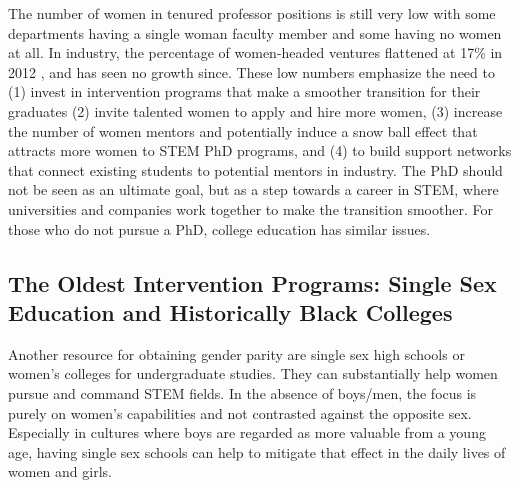 \documentclass[utf8]{frontiersSCNS} %
\begin{document}
The number of women in tenured professor positions is still very low with some departments having a single woman faculty member and some having no women at all. In industry, the percentage of women-headed ventures flattened at 17\% in 2012 \citep{teare20172017}, and has seen no growth since. These low numbers emphasize the need to (1) invest in intervention programs that make a smoother transition for their graduates (2) invite talented women to apply and hire more women, (3) increase the number of women mentors and potentially induce a snow ball effect that attracts more women to STEM PhD programs, and (4) to build support networks that connect existing students to potential mentors in industry. The PhD should not be seen as an ultimate goal, but as a step towards a career in STEM, where universities and companies work together to make the transition smoother. For those who do not pursue a PhD, college education has similar issues.



\subsection{The Oldest Intervention Programs: Single Sex Education and Historically Black Colleges}
\label{Sec7}
Another resource for obtaining gender parity  are single sex high schools or women’s colleges for undergraduate studies. They can substantially help women pursue and command STEM fields. In the absence of boys/men, the focus is purely on women’s capabilities and not contrasted against the opposite sex. Especially in cultures where boys are regarded as more valuable from a young age, having single sex schools can help to mitigate that effect in the daily lives of women and girls. %
\end{document}
